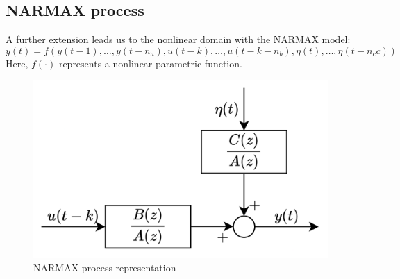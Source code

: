 \subsection{NARMAX process}
A further extension leads us to the nonlinear domain with the NARMAX model:
\[y(t) = f(y(t-1), \dots, y(t-n_a), u(t-k), \dots, u(t-k-n_b), \eta(t), \dots, \eta(t-n_cc))\]
Here, $f(\cdot)$ represents a nonlinear parametric function.
\begin{figure}[H]
    \centering
    \includegraphics[width=0.4\linewidth]{images/narmax.png} 
    \caption{NARMAX process representation}
\end{figure}